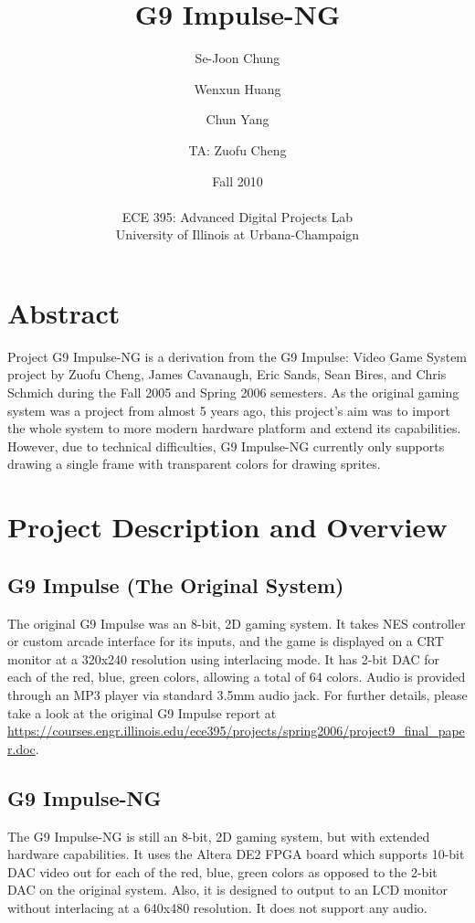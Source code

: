\documentclass{report}
\title{G9 Impulse-NG}
\author{Se-Joon Chung \and Wenxun Huang \and Chun Yang \and TA: Zuofu Cheng}
\date{Fall 2010 \\ \hfill \\ ECE 395: Advanced Digital Projects Lab \\ University of Illinois at Urbana-Champaign}
\begin{document}
\maketitle
\newpage

\section*{Abstract}
Project G9 Impulse-NG is a derivation from the G9 Impulse: Video Game 
System project by Zuofu Cheng, James Cavanaugh, Eric Sands, Sean Bires, 
and Chris Schmich during the Fall 2005 and Spring 2006 semesters. As 
the original gaming system was a project from almost 5 years ago, this 
project’s aim was to import the whole system to more modern hardware 
platform and extend its capabilities. However, due to technical 
difficulties, G9 Impulse-NG currently only supports drawing a single 
frame with transparent colors for drawing sprites.

\tableofcontents
\newpage

\section{Project Description and Overview}
\subsection{G9 Impulse (The Original System)}
The original G9 Impulse was an 8-bit, 2D gaming system. It takes NES 
controller or custom arcade interface for its inputs, and the game is 
displayed on a CRT monitor at a 320x240 resolution using interlacing 
mode. It has 2-bit DAC for each of the red, blue, green colors, 
allowing a total of 64 colors. Audio is provided through an MP3 player 
via standard 3.5mm audio jack. For further details, please take a look 
at the original G9 Impulse report at 
\url{https://courses.engr.illinois.edu/ece395/projects/spring2006/project9\_final\_paper.doc}.

\subsection{G9 Impulse-NG}
The G9 Impulse-NG is still an 8-bit, 2D gaming system, but with extended 
hardware capabilities. It uses the Altera DE2 FPGA board which supports 
10-bit DAC video out for each of the red, blue, green colors as opposed 
to the 2-bit DAC on the original system. Also, it is designed to output 
to an LCD monitor without interlacing at a 640x480 resolution. It does 
not support any audio.
\end{document}
